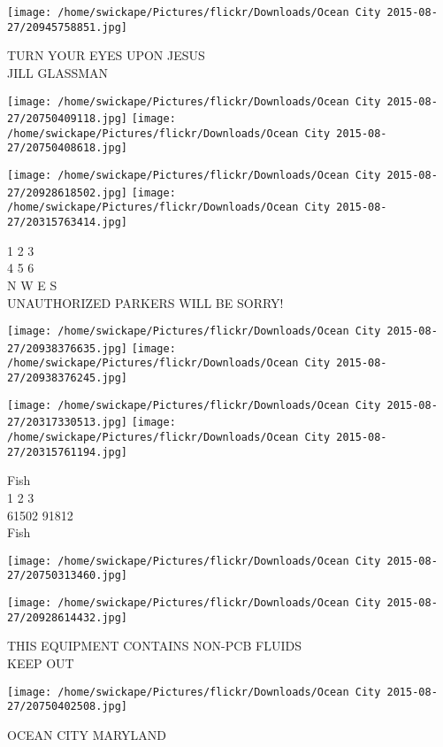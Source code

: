\documentclass[10pt,letterpaper]{article}
\begin{document}
\vspace{0.25in}
\texttt{[image: /home/swickape/Pictures/flickr/Downloads/Ocean City 2015-08-27/20945758851.jpg]}

TURN YOUR EYES UPON JESUS\\
JILL GLASSMAN\\
\pagebreak

\texttt{[image: /home/swickape/Pictures/flickr/Downloads/Ocean City 2015-08-27/20750409118.jpg]}
\texttt{[image: /home/swickape/Pictures/flickr/Downloads/Ocean City 2015-08-27/20750408618.jpg]}

\texttt{[image: /home/swickape/Pictures/flickr/Downloads/Ocean City 2015-08-27/20928618502.jpg]}
\texttt{[image: /home/swickape/Pictures/flickr/Downloads/Ocean City 2015-08-27/20315763414.jpg]}

1 2 3\\
4 5 6\\
N W E S\\
UNAUTHORIZED PARKERS WILL BE SORRY!\\
\pagebreak

\texttt{[image: /home/swickape/Pictures/flickr/Downloads/Ocean City 2015-08-27/20938376635.jpg]}
\texttt{[image: /home/swickape/Pictures/flickr/Downloads/Ocean City 2015-08-27/20938376245.jpg]}

\texttt{[image: /home/swickape/Pictures/flickr/Downloads/Ocean City 2015-08-27/20317330513.jpg]}
\texttt{[image: /home/swickape/Pictures/flickr/Downloads/Ocean City 2015-08-27/20315761194.jpg]}

Fish\\
1 2 3\\
61502 91812\\
Fish\\
\pagebreak

\texttt{[image: /home/swickape/Pictures/flickr/Downloads/Ocean City 2015-08-27/20750313460.jpg]}

\vspace{0.25in}
\texttt{[image: /home/swickape/Pictures/flickr/Downloads/Ocean City 2015-08-27/20928614432.jpg]}

THIS EQUIPMENT CONTAINS NON{-}PCB FLUIDS\\
KEEP OUT\\
\pagebreak

\texttt{[image: /home/swickape/Pictures/flickr/Downloads/Ocean City 2015-08-27/20750402508.jpg]}

OCEAN CITY MARYLAND\\
\pagebreak
\end{document}

